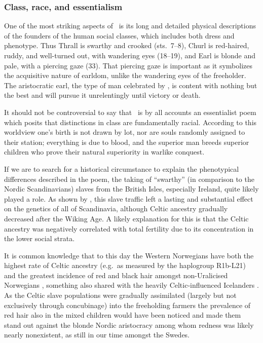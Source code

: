 \subsubsection{Class, race, and essentialism}

One of the most striking aspects of \Rigsthula\ is its long and detailed physical descriptions of the founders of the human social classes, which includes both dress and phenotype.  Thus Thrall is swarthy and crooked (sts.~7--8), Churl is red-haired, ruddy, and well-turned out, with wandering eyes (18--19), and Earl is blonde and pale, with a piercing gaze (33).  That piercing gaze is important as it symbolizes the acquisitive nature of earldom, unlike the wandering eyes of the freeholder.  The aristocratic earl, the type of man celebrated by \Rigsthula, is content with nothing but the best and will pursue it unrelentingly until victory or death.

It should not be controversial to say that \Rigsthula\ is by all accounts an essentialist poem which posits that distinctions in class are fundamentally racial.  According to this worldview one’s birth is not drawn by lot, nor are souls randomly assigned to their station; everything is due to blood, and the superior man breeds superior children who prove their natural superiority in warlike conquest.

If we are to search for a historical circumstance to explain the phenotypical differences described in the poem, the taking of “swarthy” (in comparison to the Nordic Scandinavians) slaves from the British Isles, especially Ireland, quite likely played a role.  As shown by \textcite{RodriguezVarela2023}, this slave traffic left a lasting and substantial effect on the genetics of all of Scandinavia, although Celtic ancestry gradually decreased after the Wiking Age.  A likely explanation for this is that the Celtic ancestry was negatively correlated with total fertility due to its concentration in the lower social strata.

It is common knowledge that to this day the Western Norwegians have both the highest rate of Celtic ancestry (e.g.~as measured by the haplogroup R1b-L21) and the greatest incidence of red and black hair amongst non-Uralic\-ised Norwegians \parencite{Bryn1929}, something also shared with the heavily Celtic-influenced Icelanders \parencite[326]{Coon1939}. %
As the Celtic slave populations were gradually assimilated (largely but not exclusively through concubinage) into the freeholding farmers the prevalence of red hair also in the mixed children would have been noticed and made them stand out against the blonde Nordic aristocracy among whom redness was likely nearly nonexistent, as still in our time amongst the Swedes.

